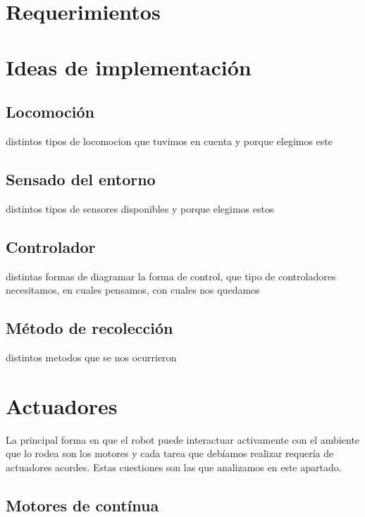 \section{Requerimientos}
\label{h_requerimientos}

\section{Ideas de implementaci\'on}
\label{h_ideas}

\subsection{Locomoci\'on}
\label{h_ideas_locomocion}

distintos tipos de locomocion que tuvimos en cuenta y porque elegimos este

\subsection{Sensado del entorno}
\label{h_ideas_sensado}

distintos tipos de sensores disponibles y porque elegimos estos

\subsection{Controlador}
\label{h_ideas_controlador}

distintas formas de diagramar la forma de control, que tipo de controladores necesitamos, en cuales pensamos, con cuales nos quedamos

\subsection{M\'etodo de recolecci\'on}
\label{h_ideas_recoleccion}

distintos metodos que se nos ocurrieron

\section{Actuadores}
\label{h_actuadores}

La principal forma en que el robot puede interactuar activamente con el ambiente que lo rodea son los motores y
cada tarea que deb\'iamos realizar requer\'ia de actuadores acordes.
Estas cuestiones son las que analizamos en este apartado.

\subsection{Motores de cont\'inua}
\label{h_actuadores_motorDC}

